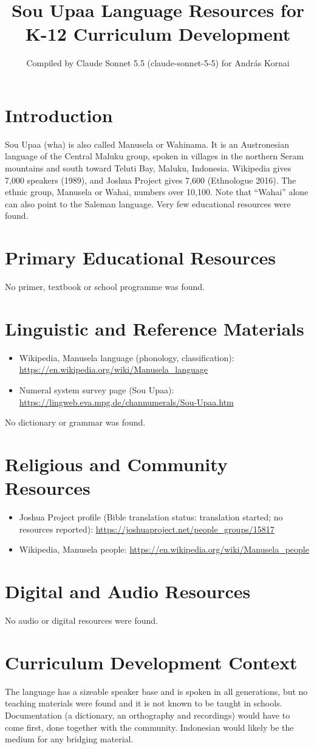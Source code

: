 \documentclass[12pt]{article}
\title{Sou Upaa Language Resources for K-12 Curriculum Development}
\author{Compiled by Claude Sonnet 5.5 (claude-sonnet-5-5) for Andr\'as Kornai}
\date{}
\begin{document}
\maketitle

\section{Introduction}
Sou Upaa (wha) is also called Manusela or Wahinama. It is an Austronesian language of the Central Maluku group, spoken in villages in the northern Seram mountains and south toward Teluti Bay, Maluku, Indonesia. Wikipedia gives 7,000 speakers (1989), and Joshua Project gives 7,600 (Ethnologue 2016). The ethnic group, Manusela or Wahai, numbers over 10,100. Note that ``Wahai'' alone can also point to the Saleman language. Very few educational resources were found.

\section{Primary Educational Resources}
No primer, textbook or school programme was found.

\section{Linguistic and Reference Materials}
\begin{itemize}
\item Wikipedia, Manusela language (phonology, classification): \url{https://en.wikipedia.org/wiki/Manusela_language}
\item Numeral system survey page (Sou Upaa): \url{https://lingweb.eva.mpg.de/channumerals/Sou-Upaa.htm}
\end{itemize}
No dictionary or grammar was found.

\section{Religious and Community Resources}
\begin{itemize}
\item Joshua Project profile (Bible translation status: translation started; no resources reported): \url{https://joshuaproject.net/people_groups/15817}
\item Wikipedia, Manusela people: \url{https://en.wikipedia.org/wiki/Manusela_people}
\end{itemize}

\section{Digital and Audio Resources}
No audio or digital resources were found.

\section{Curriculum Development Context}
The language has a sizeable speaker base and is spoken in all generations, but no teaching materials were found and it is not known to be taught in schools. Documentation (a dictionary, an orthography and recordings) would have to come first, done together with the community. Indonesian would likely be the medium for any bridging material.
\end{document}
